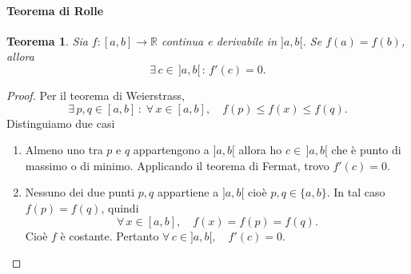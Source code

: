 \documentclass{article}
\theoremstyle{plain}
\newtheorem{thm}{Teorema}[section]
\theoremstyle{definition}
\theoremstyle{remark}
\begin{document}
\paragraph{Teorema di Rolle}
\begin{bxthm}
\begin{thm}
    Sia $f:[a,b]\to\mathbb{R}$ continua e derivabile in $]a,b[$. 
    Se $f(a)=f(b)$, allora 
    \[\exists\, c \in \,]a,b[\,:\,f'(c)=0.\]
\end{thm}
\end{bxthm}
\begin{proof}
    Per il teorema di Weierstrass,
    \[\exists\,p,q\in[a,b]\,:\;\forall\, x\in [a,b],\quad f(p)\leq f(x)\leq f(q).\]
    Distinguiamo due casi 
    \begin{enumerate}
        \item Almeno uno tra $p$ e $q$ appartengono a $]a,b[$ allora ho $c\in\, ]a,b[$ che è punto di massimo o di minimo. 
        Applicando il teorema di Fermat, trovo $f'(c)=0$.
        \item Nessuno dei due punti $p,q$ appartiene a $]a,b[$ cioè $p,q\in\{a,b\}$. 
        In tal caso $f(p)=f(q)$, quindi \[\forall\,x\in [a,b],\quad f(x)=f(p)=f(q).\]
        Cioè $f$ è costante. Pertanto $\forall\,c\in]a,b[,\quad f'(c)=0$.
    \end{enumerate}
\end{proof}

\vspace{10pt}
\end{document}
